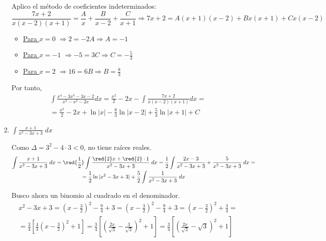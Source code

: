 \begin{ejercicio}
\begin{enumerate}
    Aplico el método de coeficientes indeterminados:
    \begin{equation*}
        \frac{7x+2}{x(x-2)(x+1)} = \frac{A}{x} + \frac{B}{x-2} + \frac{C}{x+1} \Longrightarrow 7x+2=A(x+1)(x-2)+Bx(x+1)+Cx(x-2)
    \end{equation*}
    \begin{itemize}
        \item \underline{Para $x=0$} $\Longrightarrow 2=-2A \Longrightarrow A=-1$

        \item \underline{Para $x=-1$} $\Longrightarrow -5=3C \Longrightarrow C=-\frac{5}{3}$

        \item \underline{Para $x=2$} $\Longrightarrow 16=6B \Longrightarrow B=\frac{8}{3}$
    \end{itemize}

    Por tanto,
    \begin{multline*}
        \int \frac{x^4-3x^3-3x-2}{x^3-x^2-2x}dx = \frac{x^2}{2}-2x -\int \frac{7x+2}{x(x-2)(x+1)}dx 
        =\\=
        \frac{x^2}{2}-2x +\ln|x|-\frac{8}{3}\ln |x-2|+\frac{5}{3}\ln|x+1|+C
    \end{multline*}

    \item $\displaystyle \int \frac{x+1}{x^2-3x+3}\;dx$

    Como $\Delta=3^2-4\cdot 3 <0$, no tiene raíces reales.
    \begin{multline*}
        \int \frac{x+1}{x^2-3x+3}\;dx =\red{\frac{1}{2}} \int \frac{\red{2}x+\red{2}\cdot 1}{x^2-3x+3}\;dx
        = \frac{1}{2} \int \frac{2x-3}{x^2-3x+3} +\frac{5}{x^2-3x+3}\;dx
        =\\=\frac{1}{2}\ln|x^2-3x+3|+\frac{5}{2}\int \frac{1}{x^2-3x+3}\;dx
    \end{multline*}

    Busco ahora un binomio al cuadrado en el denominador.
    \begin{multline*}
        x^2-3x+3 = \left(x-\frac{3}{2}\right)^2-\frac{9}{4}+3
        = \left(x-\frac{3}{2}\right)^2-\frac{9}{4}+3
        = \left(x-\frac{3}{2}\right)^2+\frac{3}{4}
        =\\=
        \frac{3}{4}\left[\frac{4}{3}\left(x-\frac{3}{2}\right)^2+1\right]
        =
        \frac{3}{4}\left[\left(\frac{2x}{\sqrt{3}}-\frac{3}{\sqrt{3}}\right)^2+1\right]
        =
        \frac{3}{4}\left[\left(\frac{2x}{\sqrt{3}}-\sqrt{3}\right)^2+1\right]
    \end{multline*}


\end{enumerate}
\end{ejercicio}
